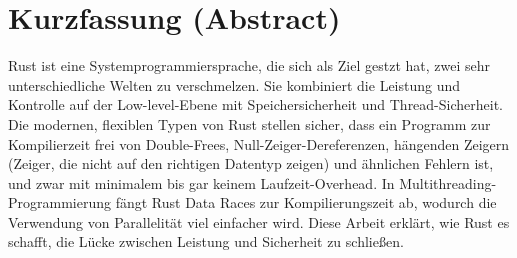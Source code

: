 \chapter*{Kurzfassung (Abstract)}

Rust ist eine Systemprogrammiersprache, die sich als Ziel gestzt hat, zwei sehr unterschiedliche Welten zu verschmelzen. Sie kombiniert die Leistung und Kontrolle auf der Low-level-Ebene mit Speichersicherheit und Thread-Sicherheit. Die modernen, flexiblen Typen von Rust stellen sicher, dass ein Programm zur Kompilierzeit frei von Double-Frees, Null-Zeiger-Dereferenzen, hängenden Zeigern (Zeiger, die nicht auf den richtigen Datentyp zeigen) und ähnlichen Fehlern ist, und zwar mit minimalem bis gar keinem Laufzeit-Overhead. In Multithreading-Programmierung fängt Rust Data Races zur Kompilierungszeit ab, wodurch die Verwendung von Parallelität viel einfacher wird. Diese Arbeit erklärt, wie Rust es schafft, die Lücke zwischen Leistung und Sicherheit zu schließen.
